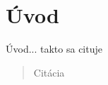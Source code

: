 \chapter*{Úvod} %

Úvod...
takto sa cituje \cite{smernica}

\begin{quote}
    Citácia
\end{quote}
 

